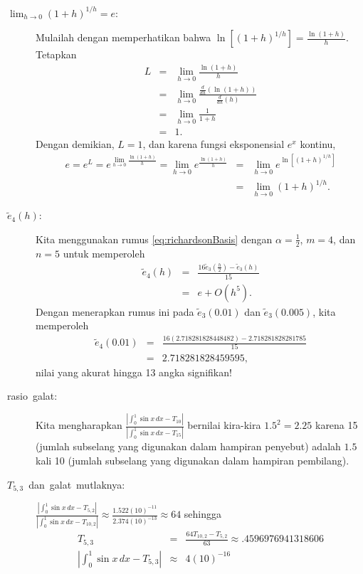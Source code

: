 \begin{description}
\item [{${\displaystyle \lim_{h\to0}(1+h)^{1/h}=e}$:}] \label{proofOfLimit}Mulailah
dengan memperhatikan bahwa $\ln\left[(1+h)^{1/h}\right]=\frac{\ln(1+h)}{h}$.
Tetapkan 
\begin{eqnarray*}
L & = & \lim_{h\to0}\frac{\ln(1+h)}{h}\\
 & = & \lim_{h\to0}\frac{\frac{d}{dh}(\ln(1+h))}{\frac{d}{dh}(h)}\\
 & = & \lim_{h\to0}\frac{1}{1+h}\\
 & = & 1.
\end{eqnarray*}
Dengan demikian, $L=1$, dan karena fungsi eksponensial $e^{x}$ kontinu,
\begin{eqnarray*}
e=e^{L}=e^{\lim_{h\to0}\frac{\ln(1+h)}{h}}=\lim_{h\to0}e^{\frac{\ln(1+h)}{h}} & = & \lim_{h\to0}e^{\ln\left[(1+h)^{1/h}\right]}\\
 & = & \lim_{h\to0}(1+h)^{1/h}.
\end{eqnarray*}
\item [{$\tilde{e}_{4}(h)$:}] \label{eTilde4}Kita menggunakan rumus \ref{eq:richardsonBasis}
dengan $\alpha=\frac{1}{2}$, $m=4$, dan $n=5$ untuk memperoleh
\begin{eqnarray*}
\tilde{e}_{4}(h) & = & \frac{16\tilde{e}_{3}\left(\frac{h}{2}\right)-\tilde{e}_{3}(h)}{15}\\
 & = & e+O(h^{5}).
\end{eqnarray*}
Dengan menerapkan rumus ini pada $\tilde{e}_{3}(0.01)$ dan $\tilde{e}_{3}(0.005)$,
kita memperoleh
\begin{eqnarray*}
\tilde{e}_{4}(0.01) & = & \frac{16(2.718281828448482)-2.718281828281785}{15}\\
 & = & 2.718281828459595,
\end{eqnarray*}
nilai yang akurat hingga 13 angka signifikan!
\item [{rasio~galat:}] \label{errorRatio}Kita mengharapkan $\frac{\left|\int_{0}^{1}\sin x\,dx-T_{10}\right|}{\left|\int_{0}^{1}\sin x\,dx-T_{15}\right|}$
bernilai kira-kira $1.5^{2}=2.25$ karena 15 (jumlah subselang yang
digunakan dalam hampiran penyebut) adalah $1.5$ kali 10 (jumlah subselang
yang digunakan dalam hampiran pembilang).
\item [{$T_{5,3}$~dan~galat~mutlaknya:}] \label{t35}$\frac{\left|\int_{0}^{1}\sin x\,dx-T_{5,2}\right|}{\left|\int_{0}^{1}\sin x\,dx-T_{10,2}\right|}\approx\frac{1.522(10)^{-11}}{2.374(10)^{-13}}\approx64$
sehingga 
\begin{eqnarray*}
T_{5,3} & = & \frac{64T_{10,2}-T_{5,2}}{63}\approx.4596976941318606\\
\left|\int_{0}^{1}\sin x\,dx-T_{5,3}\right| & \approx & 4(10)^{-16}
\end{eqnarray*}
\end{description}


